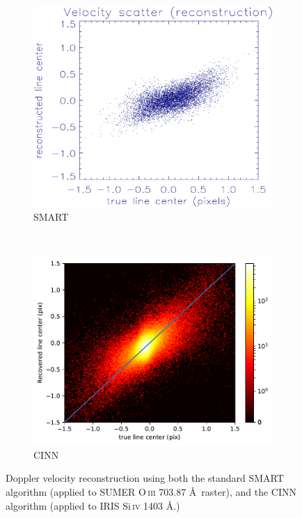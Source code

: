 \documentclass[10pt,letterpaper]{article}
\begin{document}
			
				\begin{figure}[h!]
					\centering
					\begin{subfigure}[t]{0.5\textwidth}
						\centering
						\includegraphics[width=\textwidth]{fig/smart_hist}
						\caption{SMART}
					\end{subfigure}%
					~ 
					\begin{subfigure}[t]{0.5\textwidth}
						\centering
						\includegraphics[width=\textwidth]{fig/linearity}
						\caption{CINN}
					\end{subfigure}
					\caption{Doppler velocity reconstruction using both the standard SMART algorithm (applied to SUMER O\,\textsc{iii} 703.87 \AA\ raster), and the CINN algorithm (applied to IRIS Si\,\textsc{iv} 1403 \AA.)}
					\label{dopp_hist}
				\end{figure}
				
\end{document}
